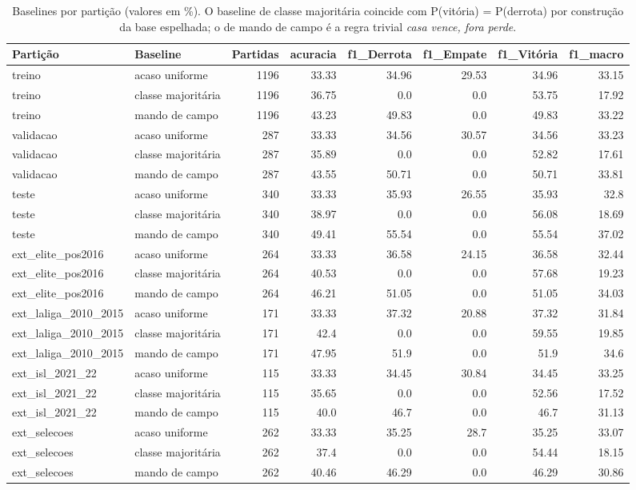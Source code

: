 \begin{table}[htbp]
\centering
\caption{Baselines por partição (valores em \%). O baseline de classe majoritária coincide com P(vitória) = P(derrota) por construção da base espelhada; o de mando de campo é a regra trivial \emph{casa vence, fora perde}.}
\label{tab:baselines}
\small
\begin{tabular}{llrrrrrr}
\toprule
Partição & Baseline & Partidas & acuracia & f1\_Derrota & f1\_Empate & f1\_Vitória & f1\_macro \\
\midrule
treino & acaso uniforme & 1196 & 33.33 & 34.96 & 29.53 & 34.96 & 33.15 \\
treino & classe majoritária & 1196 & 36.75 & 0.0 & 0.0 & 53.75 & 17.92 \\
treino & mando de campo & 1196 & 43.23 & 49.83 & 0.0 & 49.83 & 33.22 \\
validacao & acaso uniforme & 287 & 33.33 & 34.56 & 30.57 & 34.56 & 33.23 \\
validacao & classe majoritária & 287 & 35.89 & 0.0 & 0.0 & 52.82 & 17.61 \\
validacao & mando de campo & 287 & 43.55 & 50.71 & 0.0 & 50.71 & 33.81 \\
teste & acaso uniforme & 340 & 33.33 & 35.93 & 26.55 & 35.93 & 32.8 \\
teste & classe majoritária & 340 & 38.97 & 0.0 & 0.0 & 56.08 & 18.69 \\
teste & mando de campo & 340 & 49.41 & 55.54 & 0.0 & 55.54 & 37.02 \\
ext\_elite\_pos2016 & acaso uniforme & 264 & 33.33 & 36.58 & 24.15 & 36.58 & 32.44 \\
ext\_elite\_pos2016 & classe majoritária & 264 & 40.53 & 0.0 & 0.0 & 57.68 & 19.23 \\
ext\_elite\_pos2016 & mando de campo & 264 & 46.21 & 51.05 & 0.0 & 51.05 & 34.03 \\
ext\_laliga\_2010\_2015 & acaso uniforme & 171 & 33.33 & 37.32 & 20.88 & 37.32 & 31.84 \\
ext\_laliga\_2010\_2015 & classe majoritária & 171 & 42.4 & 0.0 & 0.0 & 59.55 & 19.85 \\
ext\_laliga\_2010\_2015 & mando de campo & 171 & 47.95 & 51.9 & 0.0 & 51.9 & 34.6 \\
ext\_isl\_2021\_22 & acaso uniforme & 115 & 33.33 & 34.45 & 30.84 & 34.45 & 33.25 \\
ext\_isl\_2021\_22 & classe majoritária & 115 & 35.65 & 0.0 & 0.0 & 52.56 & 17.52 \\
ext\_isl\_2021\_22 & mando de campo & 115 & 40.0 & 46.7 & 0.0 & 46.7 & 31.13 \\
ext\_selecoes & acaso uniforme & 262 & 33.33 & 35.25 & 28.7 & 35.25 & 33.07 \\
ext\_selecoes & classe majoritária & 262 & 37.4 & 0.0 & 0.0 & 54.44 & 18.15 \\
ext\_selecoes & mando de campo & 262 & 40.46 & 46.29 & 0.0 & 46.29 & 30.86 \\
\bottomrule
\end{tabular}
\end{table}
